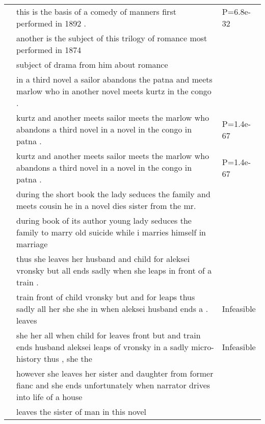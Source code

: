 \documentclass[class=article]{standalone}
\begin{document}
\begin{table*}
\begin{tabular}{ p{\collenone} p{\collentwo} p{\collenthree} }
			\textbf{\twosteptitle}  & this is the basis of a comedy of manners first performed in 1892 . & P=6.8e-32 \\
			\textbf{\iref}  & another is the subject of this trilogy of romance most performed in 1874 &  \\
			\textbf{\ip}  & subject of drama from him about romance  &  \\
			\hline
			\textbf{}  & in a third novel a sailor abandons the patna and meets marlow who in another novel meets kurtz in the congo . &  \\
			\textbf{\oracletitle}  & kurtz and another meets sailor meets the marlow who abandons a third novel in a novel in the congo in patna . & P=1.4e-67 \\
			\textbf{\twosteptitle}  & kurtz and another meets sailor meets the marlow who abandons a third novel in a novel in the congo in patna . & P=1.4e-67 \\
			\textbf{\iref}  & during the short book the lady seduces the family and meets cousin he in a novel dies sister from the mr. &  \\
			\textbf{\ip}  & during book of its author young lady seduces the family to marry old suicide while i marries himself in marriage &  \\
			\hline
			\textbf{}  & thus she leaves her husband and child for aleksei vronsky but all ends sadly when she leaps in front of a train . &  \\
			\textbf{\oracletitle}  & train front of child vronsky but and for leaps thus sadly all her she she in when aleksei husband ends a . leaves & Infeasible \\
			\textbf{\twosteptitle}  & she her all when child for leaves front but and train ends husband aleksei leaps of vronsky in a sadly micro-history thus , she the & Infeasible \\
			\textbf{\iref}  & however she leaves her sister and daughter from former fianc and she ends unfortunately when narrator drives into life of a house &  \\
			\textbf{\ip}  & leaves the sister of man in this novel &  \\
		\end{tabular}

\end{table*}
\end{document}
